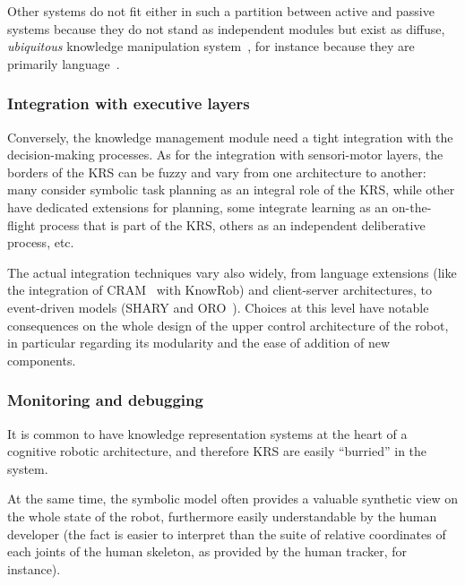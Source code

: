 
Other systems do not fit either in such a partition between active and passive
systems because they do not stand as independent modules but exist as diffuse,
\emph{ubiquitous} knowledge manipulation system~\cite{Jacobsson2008}, for
instance because they are primarily language~\cite{Ferrein2008, Sabri2011}.

\subsubsection{Integration with executive layers}
\label{sect|integration-executive-layers}

Conversely, the knowledge management module need a tight integration with the
decision-making processes. As for the integration with sensori-motor
layers, the borders of the KRS can be fuzzy and vary from one architecture to
another: many consider symbolic task planning as an integral role of the KRS,
while other have dedicated extensions for planning, some integrate learning as
an on-the-flight process that is part of the KRS, others as an independent
deliberative process, etc.

The actual integration techniques vary also widely, from language extensions
(like the integration of CRAM~\cite{Beetz2010} with KnowRob) and client-server
architectures, to event-driven models (SHARY and ORO~\cite{Alami2011}). Choices
at this level have notable consequences on the whole design of the upper
control architecture of the robot, in particular regarding its modularity and
the ease of addition of new components.

\subsubsection{Monitoring and debugging}
\label{sect|debugging}

It is common to have knowledge representation systems at the heart of a
cognitive robotic architecture, and therefore KRS are easily ``burried'' in the
system.

At the same time, the symbolic model often provides a valuable synthetic view
on the whole state of the robot, furthermore easily understandable by the human
developer (the fact  is easier to interpret than
the suite of relative coordinates of each joints of the human skeleton, as
provided by the human tracker, for instance).

